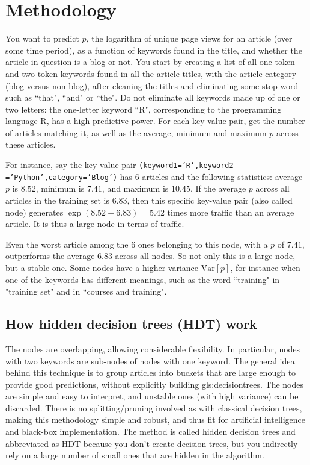 \documentclass[oneside,10pt]{book}
\begin{document}
\section{Methodology} 

You want to predict $p$, the logarithm of unique page views for an article (over some time period), as a function of keywords found in the title, and whether the article in question is a blog or not.  You start by creating a list of all one-token and two-token keywords found in all the article titles, with the article category (blog versus non-blog), after cleaning the titles and eliminating some stop word such as ``that", ``and" or ``the". Do not eliminate all keywords made up of one or two letters: the one-letter keyword ``R", corresponding to the programming language R, has a high \textcolor{index}{predictive power}.
For each key-value pair, get the number of articles matching it, as well as the average, minimum and maximum $p$ across these articles.

For instance, say the  key-value pair \texttt{(keyword1='R',keyword2 ='Python',category='Blog')} has $6$ articles and  the following statistics: average $p$ is $8.52$, minimum 
 is $7.41$, and maximum is $10.45$. If the average $p$ across all articles in the training set is  $6.83$, then this specific key-value pair (also called node) generates $\exp(8.52 - 6.83) = 5.42$ times more traffic than an average article. It is thus a large node in terms of traffic. 

Even the worst article among the $6$ ones belonging to this node, with a $p$ of $7.41$, outperforms the average $6.83$ across all nodes. So not only this is a large node, but a stable one. Some nodes have a higher variance $\text{Var}[p]$, for instance when one of the keywords has different meanings, such as the word ``training" in "training set"  and in
 ``courses and training".


\subsection{How hidden decision trees (HDT) work}\label{algoaba}

The nodes are overlapping, allowing considerable flexibility. In particular, nodes with two keywords are sub-nodes of nodes with one keyword.  
The general idea behind this technique is to group articles into buckets that are large enough to provide good predictions, without explicitly building \glspl{gls:decisiontree}.  The nodes are simple and easy to interpret, and unstable ones (with high variance) can be discarded. There is no splitting/pruning involved as with classical decision trees, making this methodology simple and robust, and thus fit for artificial intelligence and black-box implementation. The method is called 
 \textcolor{index}{hidden decision trees} and abbreviated as \textcolor{index}{HDT} because you don't create decision trees, but you indirectly rely on a large number of small ones that are hidden in the
 algorithm.
\end{document}
